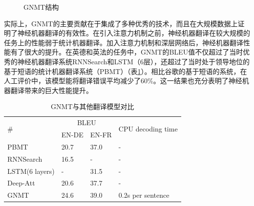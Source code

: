 \begin{figure}[htp]
\centering

\caption{GNMT结构}
\label{fig:6-35}
\end{figure}

\parinterval 实际上，GNMT的主要贡献在于集成了多种优秀的技术，而且在大规模数据上证明了神经机器翻译的有效性。在引入注意力机制之前，神经机器翻译在较大规模的任务上的性能弱于统计机器翻译。加入注意力机制和深层网络后，神经机器翻译性能有了很大的提升。在英德和英法的任务中，GNMT的BLEU值不仅超过了当时优秀的神经机器翻译系统RNNSearch和LSTM（6层），还超过了当时处于领导地位的基于短语的统计机器翻译系统（PBMT）（表\ref{tab:6-10}）。相比谷歌的基于短语的系统，在人工评价中，该模型能将翻译错误平均减少了60\%。这一结果也充分表明了神经机器翻译带来的巨大性能提升。

\begin{table}[htp]
\centering
\caption{GNMT与其他翻译模型对比\cite{Wu2016GooglesNM}}
\label{tab:6-10}
\begin{tabular}{l l l l}
\multicolumn{1}{l|}{\multirow{2}{*}{\#}} & \multicolumn{2}{c}{BLEU} & \multirow{2}{*}{CPU decoding time} \\
\multicolumn{1}{l|}{}                    & EN-DE  & EN-FR  &                                             \\ \hline
\multicolumn{1}{l|}{PBMT}                & 20.7            & 37.0            & -                                           \\
\multicolumn{1}{l|}{RNNSearch}           & 16.5            & -               & -                                           \\
\multicolumn{1}{l|}{LSTM(6 layers)}      & -               & 31.5            & -                                           \\
\multicolumn{1}{l|}{Deep-Att}            & 20.6            & 37.7            & -                                           \\
\multicolumn{1}{l|}{GNMT}                & 24.6            & 39.0            & 0.2s per sentence                           \\
\end{tabular}
\end{table}


